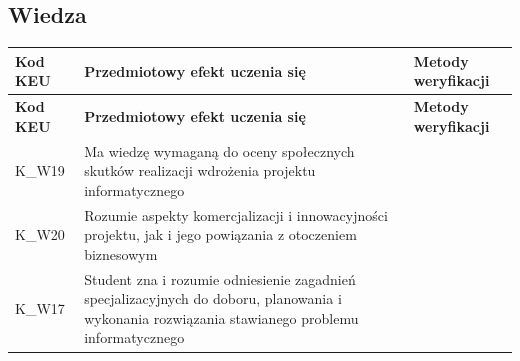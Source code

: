 \documentclass[12pt, a4paper]{article}
\newcommand{\thdrule}{\noalign{\global\setlength{\extrarowheight}{0pt}}}
\newcommand{\thdend}{\noalign{\global\setlength{\extrarowheight}{3pt}}}
\begin{document}
\subsection*{Wiedza}
{\scriptsize
\begin{longtable}{m{1.6cm}m{9.0cm}m{4.2cm}}
\thdrule\toprule
\rowcolor{pjatkRed} {\color{white}\footnotesize\textbf{\vphantom{Ag}Kod KEU}} & {\color{white}\footnotesize\textbf{\vphantom{Ag}Przedmiotowy efekt uczenia się}} & {\color{white}\footnotesize\textbf{\vphantom{Ag}Metody weryfikacji}} \\
\midrule\thdend
\endfirsthead
\thdrule\toprule
\rowcolor{pjatkRed} {\color{white}\footnotesize\textbf{\vphantom{Ag}Kod KEU}} & {\color{white}\footnotesize\textbf{\vphantom{Ag}Przedmiotowy efekt uczenia się}} & {\color{white}\footnotesize\textbf{\vphantom{Ag}Metody weryfikacji}} \\
\midrule\thdend
\endhead
  \rowcolor{tableRowLight} K\_W19 & Ma wiedzę wymaganą do oceny społecznych skutków realizacji wdrożenia projektu informatycznego &  \\
  \rowcolor{tableRowAlt} K\_W20 & Rozumie aspekty komercjalizacji i innowacyjności projektu, jak i jego powiązania z otoczeniem biznesowym &  \\
  \rowcolor{tableRowLight} K\_W17 & Student zna i rozumie odniesienie zagadnień specjalizacyjnych do doboru, planowania i wykonania rozwiązania stawianego problemu informatycznego &  \\
\bottomrule
\end{longtable}}
\end{document}
